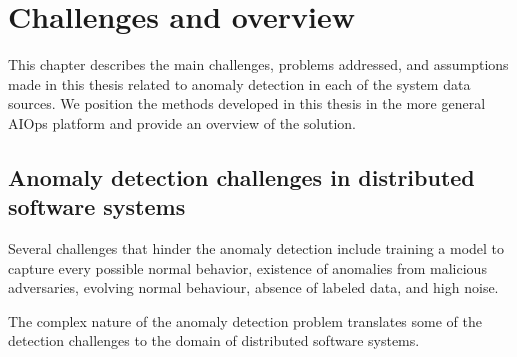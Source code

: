 \chapter{Challenges and overview}\label{ch:concepts} 
\minitoc%
\bigskip

This chapter describes the main challenges, problems addressed, and assumptions made in this thesis related to anomaly detection in each of the system data sources. We position the methods developed in this thesis in the more general AIOps platform and provide an overview of the solution.

\section{Anomaly detection challenges in distributed software systems}
\label{ch:concepts:sec:anomalydetectionindistributedsoftwaresystems}
Several challenges that hinder the anomaly detection include training a model to capture every possible normal behavior, existence of anomalies from malicious adversaries, evolving normal behaviour, absence of labeled data, and high noise. 

The complex nature of the anomaly detection problem translates some of the detection challenges to the domain of distributed software systems.

